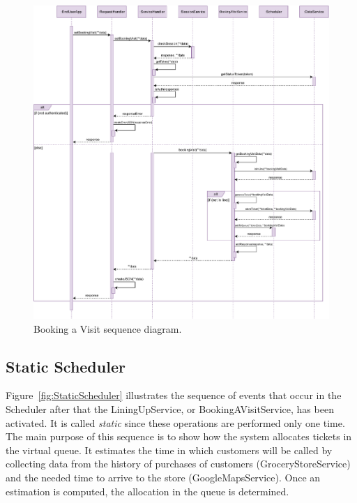\begin{figure}[H]
    \centering
    \includegraphics[width=1.0\textwidth]{images/bookingVisit_sequence_diagram.pdf}
    \caption{Booking a Visit sequence diagram.}\label{fig:BookingVisit}
\end{figure}

\subsection{Static Scheduler}

Figure~\ref{fig:StaticScheduler} illustrates the sequence of events that occur in the Scheduler after that the LiningUpService, or BookingAVisitService, has been activated.
It is called \textit{static} since these operations are performed only one time.
The main purpose of this sequence is to show how the system allocates tickets in the virtual queue. It estimates the time in which customers will be called by collecting data from the history of purchases of customers (GroceryStoreService) and the needed time to arrive to the store (GoogleMapsService). Once an estimation is computed, the allocation in the queue is determined.

